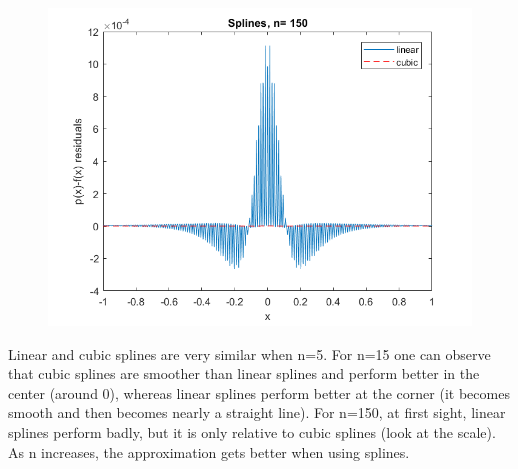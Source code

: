 \documentclass{article}
\begin{document}
\begin{figure}[h]
\begin{minipage}{0.56\textwidth}
	  \includegraphics[width = \textwidth, keepaspectratio]{n150lincub.png}
    \end{minipage}   	   
    \end{figure}
    Linear and cubic splines are very similar when n=5. For n=15 one can observe that cubic splines are smoother than linear splines and perform better in the center (around 0), whereas linear splines perform better at the corner (it becomes smooth and then becomes nearly a straight line). For n=150, at first sight, linear splines perform badly, but it is only relative to cubic splines (look at the scale). As n increases, the approximation gets better when using splines.\\
    \newpage
\end{document}
